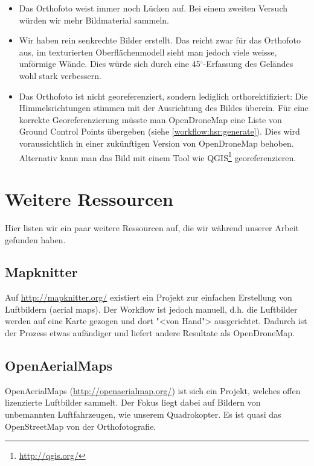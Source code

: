 \begin{itemize}
	\item Das Orthofoto weist immer noch Lücken auf. Bei einem zweiten Versuch
		würden wir mehr Bildmaterial sammeln.
	\item Wir haben rein senkrechte Bilder erstellt. Das reicht zwar für das
		Orthofoto aus, im texturierten Oberflächenmodell sieht man jedoch viele
		weisse, unförmige Wände. Dies würde sich durch eine 45$^{\circ}$-Erfassung des
		Geländes wohl stark verbessern.
	\item Das Orthofoto ist nicht georeferenziert, sondern lediglich
		orthorektifiziert: Die Himmelsrichtungen stimmen mit der Ausrichtung des
		Bildes überein. Für eine korrekte Georeferenzierung müsste man OpenDroneMap
		eine Liste von Ground Control Points übergeben (siehe
		\autoref{workflow:hsr:generate}). Dies wird voraussichtlich in einer
		zukünftigen Version von OpenDroneMap behoben. Alternativ kann man das Bild
		mit einem Tool wie QGIS\footnote{\url{http://qgis.org/}} georeferenzieren.
\end{itemize}


\section{Weitere Ressourcen}

Hier listen wir ein paar weitere Ressourcen auf, die wir während unserer Arbeit
gefunden haben.

\subsection{Mapknitter}

Auf \url{http://mapknitter.org/} existiert ein Projekt zur einfachen Erstellung
von Luftbildern (aerial maps). Der Workflow ist jedoch manuell, d.h. die
Luftbilder werden auf eine Karte gezogen und dort "<von Hand"> ausgerichtet.
Dadurch ist der Prozess etwas aufändiger und liefert andere Resultate als
OpenDroneMap.

\subsection{OpenAerialMaps}

OpenAerialMaps (\url{http://openaerialmap.org/}) ist sich ein Projekt, welches
offen lizenzierte Luftbilder sammelt. Der Fokus liegt dabei auf Bildern von
unbemannten Luftfahrzeugen, wie unserem Quadrokopter. Es ist quasi das
OpenStreetMap von der Orthofotografie.

